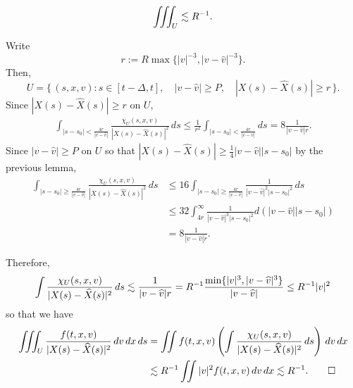 \documentclass[11pt]{amsart}
\begin{document}
\begin{prop}
\[\iiint_U\lesssim R^{-1}.\]
\end{prop}
\begin{pf}
Write
\[r:=R\max\{|v|^{-3},|v-\hat v|^{-3}\}.\]
Then,
\[U=\{\,(s,x,v):s\in[t-\Delta,t],\quad|v-\hat v|\ge P,\quad |X(s)-\hat X(s)|\ge r\,\}.\]
Since $|X(s)-\hat X(s)|\ge r$ on $U$,
\begin{align*}
\int_{|s-s_0|<\frac{4r}{|v-\hat v|}}\frac{\chi_U(s,x,v)}{|X(s)-\hat X(s)|^2}\,ds
\le\frac1{r^2}\int_{|s-s_0|<\frac{4r}{|v-\hat v|}}ds=8\frac1{|v-\hat v|r}.
\end{align*}
Since $|v-\hat v|\ge P$ on $U$ so that $|X(s)-\hat X(s)|\ge\frac14|v-\hat v||s-s_0|$ by the previous lemma,
\begin{align*}
\int_{|s-s_0|\ge\frac{4r}{|v-\hat v|}}\frac{\chi_U(s,x,v)}{|X(s)-\hat X(s)|^2}\,ds
&\le16\int_{|s-s_0|\ge\frac{4r}{|v-\hat v|}}\frac1{|v-\hat v|^2|s-s_0|^2}\,ds\\
&\le32\int_{4r}^\infty\frac1{|v-\hat v|^3|s-s_0|^2}d(|v-\hat v||s-s_0|)\\
&=8\frac1{|v-\hat v|r}.
\end{align*}

Therefore,
\[\int\frac{\chi_U(s,x,v)}{|X(s)-\widehat X(s)|^2}\,ds\lesssim\frac1{|v-\widehat v|r}=R^{-1}\frac{\min\{|v|^3,|v-\widehat v|^3\}}{|v-\widehat v|}\le R^{-1}|v|^2\]
so that we have
\begin{align*}
\iiint_U\frac{f(t,x,v)}{|X(s)-\widehat X(s)|^2}\,dv\,dx\,ds
&=\iint f(t,x,v)\left(\int\frac{\chi_U(s,x,v)}{|X(s)-\widehat X(s)|^2}\,ds\right)\,dv\,dx\\
&\lesssim R^{-1}\iint|v|^2f(t,x,v)\,dv\,dx\lesssim R^{-1}.\qedhere
\end{align*}
\end{pf}
\end{document}

